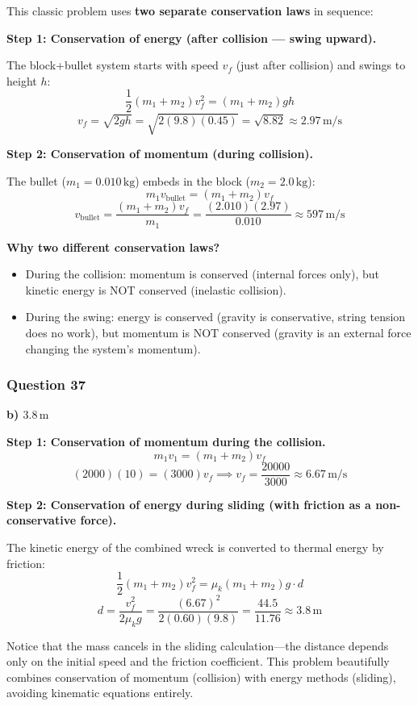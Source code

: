 \documentclass[12pt,letterpaper]{article}
\begin{document}
\begin{explanationbox}
This classic problem uses \textbf{two separate conservation laws} in sequence:

\textbf{Step 1: Conservation of energy (after collision --- swing upward).}

The block+bullet system starts with speed $v_f$ (just after collision) and swings to height $h$:
\[
\frac{1}{2}(m_1 + m_2)v_f^2 = (m_1 + m_2)gh
\]
\[
v_f = \sqrt{2gh} = \sqrt{2(9.8)(0.45)} = \sqrt{8.82} \approx 2.97\,\text{m/s}
\]

\textbf{Step 2: Conservation of momentum (during collision).}

The bullet ($m_1 = 0.010\,\text{kg}$) embeds in the block ($m_2 = 2.0\,\text{kg}$):
\[
m_1 v_{\text{bullet}} = (m_1 + m_2)v_f
\]
\[
v_{\text{bullet}} = \frac{(m_1 + m_2)v_f}{m_1} = \frac{(2.010)(2.97)}{0.010} \approx 597\,\text{m/s}
\]

\textbf{Why two different conservation laws?}
\begin{itemize}
\item During the collision: momentum is conserved (internal forces only), but kinetic energy is NOT conserved (inelastic collision).
\item During the swing: energy is conserved (gravity is conservative, string tension does no work), but momentum is NOT conserved (gravity is an external force changing the system's momentum).
\end{itemize}
\end{explanationbox}

\subsubsection*{Question 37}

\begin{answerbox}
\textbf{b) $3.8\,\text{m}$}
\end{answerbox}

\begin{explanationbox}
\textbf{Step 1: Conservation of momentum during the collision.}
\[
m_1 v_1 = (m_1 + m_2)v_f
\]
\[
(2000)(10) = (3000)v_f \implies v_f = \frac{20000}{3000} \approx 6.67\,\text{m/s}
\]

\textbf{Step 2: Conservation of energy during sliding (with friction as a non-conservative force).}

The kinetic energy of the combined wreck is converted to thermal energy by friction:
\[
\frac{1}{2}(m_1 + m_2)v_f^2 = \mu_k (m_1 + m_2)g \cdot d
\]
\[
d = \frac{v_f^2}{2\mu_k g} = \frac{(6.67)^2}{2(0.60)(9.8)} = \frac{44.5}{11.76} \approx 3.8\,\text{m}
\]

Notice that the mass cancels in the sliding calculation---the distance depends only on the initial speed and the friction coefficient. This problem beautifully combines conservation of momentum (collision) with energy methods (sliding), avoiding kinematic equations entirely.
\end{explanationbox}
\end{document}
